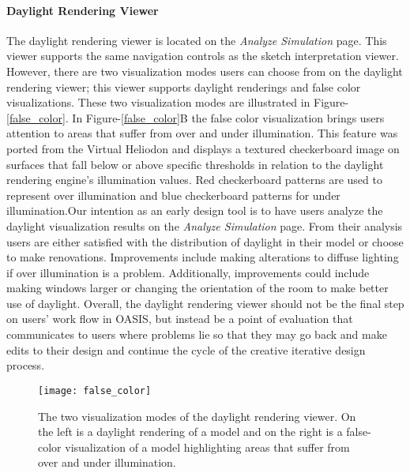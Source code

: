 \paragraph{Daylight Rendering Viewer}
The daylight rendering viewer is located on the \textit{Analyze Simulation} page. This viewer supports the same navigation controls as the sketch interpretation viewer. However, there are two visualization modes users can choose from on the daylight rendering viewer; this viewer supports daylight renderings and false color visualizations. These two visualization modes are illustrated in Figure-\ref{false_color}.
In Figure-\ref{false_color}B the false color visualization brings users attention to areas that suffer from over and under illumination. This feature was ported from the Virtual Heliodon and displays a textured checkerboard image on surfaces that fall below or above specific thresholds in relation to the daylight rendering engine's illumination values\cite{nasman2013evaluation}. Red checkerboard patterns are used to represent over illumination and blue checkerboard patterns for under illumination.Our intention as an early design tool is to have users analyze the daylight visualization results on the \textit{Analyze Simulation} page. From their analysis users are either satisfied with the distribution of daylight in their model or choose to make renovations. Improvements include making alterations to diffuse lighting if over illumination is a problem. Additionally, improvements could include making windows larger or changing the orientation of the room to make better use of daylight. Overall, the daylight rendering viewer should not be the final step on users' work flow in OASIS, but instead be a point of evaluation that communicates to users where problems lie so that they may go back and make edits to their design and continue the cycle of the creative iterative design process. 

\begin{figure}[h]
\centering
\texttt{[image: false\_color]}
\caption{The two visualization modes of the daylight rendering viewer. On the left is a daylight rendering of a model and on the right is a false-color visualization of a model highlighting areas that suffer from over and under illumination.}
\label{fig:false_color}
\end{figure}

